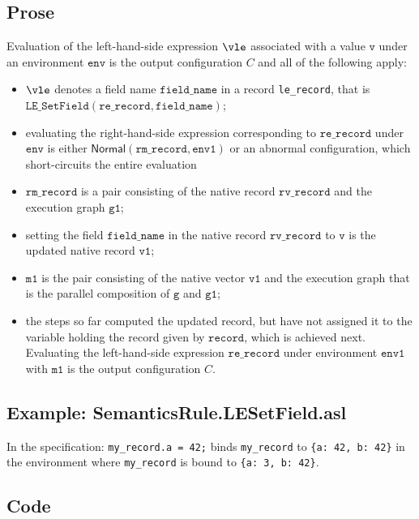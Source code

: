 \documentclass{book}
\newcommand\ProseOrAbnormal[0]{or an abnormal configuration, which short-circuits the entire evaluation}
\newcommand\Normal[0]{\textsf{Normal}}
\newcommand\env[0]{\texttt{env}}
\newcommand\envone[0]{\texttt{env1}}
\newcommand\vg[0]{\texttt{g}}
\newcommand\vv[0]{\texttt{v}}
\newcommand\vvone[0]{\texttt{v1}}
\newcommand\vmone[0]{\texttt{m1}}
\newcommand\vgone[0]{\texttt{g1}}
\newcommand\fieldname[0]{\texttt{field\_name}}
\newcommand\record[0]{\texttt{record}}
\newcommand\rerecord[0]{\texttt{re\_record}}
\newcommand\rmrecord[0]{\texttt{rm\_record}}
\newcommand\rvrecord[0]{\texttt{rv\_record}}
\begin{document}
  \subsection{Prose}
    Evaluation of the left-hand-side expression $\vle$ associated with a
    value $\vv$ under an environment $\env$ is the output configuration $C$
    and all of the following apply:
    \begin{itemize}
    \item $\vle$ denotes a field name $\fieldname$ in a record \texttt{le\_record},
    that is \\ $\texttt{LE\_SetField}(\rerecord, \fieldname)$;
    \item evaluating the right-hand-side expression corresponding to $\rerecord$
    under $\env$ is either $\Normal(\rmrecord, \envone)$ \ProseOrAbnormal
    \item $\rmrecord$ is a pair consisting of the native record $\rvrecord$ and
    the execution graph $\vgone$;
    \item setting the field $\fieldname$ in the native record $\rvrecord$ to $\vv$
    is the updated native record $\vvone$;
    \item $\vmone$ is the pair consisting of the native vector $\vvone$ and the
    execution graph that is the parallel composition of $\vg$ and $\vgone$;
    \item the steps so far computed the updated record, but have not assigned it to
    the variable holding the record given by $\record$, which is achieved next.
    Evaluating the left-hand-side expression $\rerecord$ under environment $\envone$ with $\vmone$
    is the output configuration $C$.
  \end{itemize}

    \subsection{Example: SemanticsRule.LESetField.asl}
    In the specification:
    \texttt{my\_record.a = 42;} binds \texttt{my\_record} to \texttt{\{a: 42, b: 42\}} in the environment where \texttt{my\_record} is bound to \texttt{\{a: 3, b: 42\}}.

  \subsection{Code}
\end{document}
